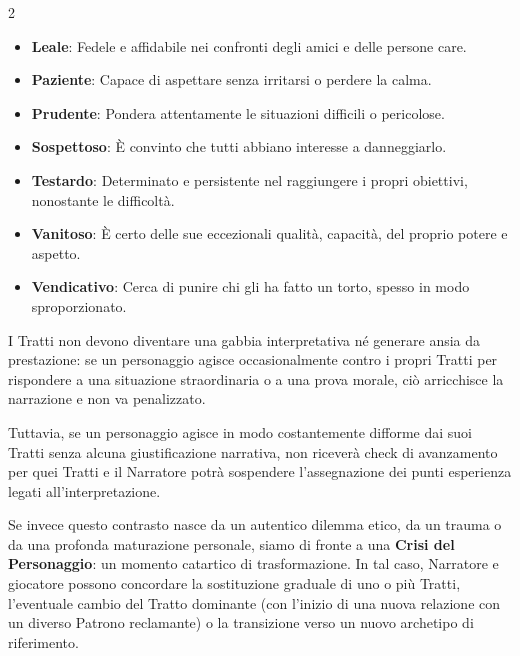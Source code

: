 \begin{multicols}{2}
\begin{itemize}[leftmargin=*]
	\item \textbf{Leale}: Fedele e affidabile nei confronti degli amici e delle persone care.
	\item \textbf{Paziente}: Capace di aspettare senza irritarsi o perdere la calma.
	\item \textbf{Prudente}: Pondera attentamente le situazioni difficili o pericolose.
        \item \textbf{Sospettoso}: È convinto che tutti abbiano interesse a danneggiarlo.
	\item \textbf{Testardo}: Determinato e persistente nel raggiungere i propri obiettivi, nonostante le difficoltà.
        \item \textbf{Vanitoso}: È certo delle sue eccezionali qualità, capacità, del proprio potere e aspetto.
	\item \textbf{Vendicativo}: Cerca di punire chi gli ha fatto un torto, spesso in modo sproporzionato.

\end{itemize}

\end{multicols}

\vfill


\begin{narratore}
I Tratti non devono diventare una gabbia interpretativa né generare ansia da prestazione: se un personaggio agisce occasionalmente contro i propri Tratti per rispondere a una situazione straordinaria o a una prova morale, ciò arricchisce la narrazione e non va penalizzato. 

Tuttavia, se un personaggio agisce in modo costantemente difforme dai suoi Tratti senza alcuna giustificazione narrativa, non riceverà check di avanzamento per quei Tratti e il Narratore potrà sospendere l'assegnazione dei punti esperienza legati all'interpretazione. 

Se invece questo contrasto nasce da un autentico dilemma etico, da un trauma o da una profonda maturazione personale, siamo di fronte a una \textbf{Crisi del Personaggio}: un momento catartico di trasformazione. In tal caso, Narratore e giocatore possono concordare la sostituzione graduale di uno o più Tratti, l'eventuale cambio del Tratto dominante (con l'inizio di una nuova relazione con un diverso Patrono reclamante) o la transizione verso un nuovo archetipo di riferimento.
\end{narratore}





\pagebreak

